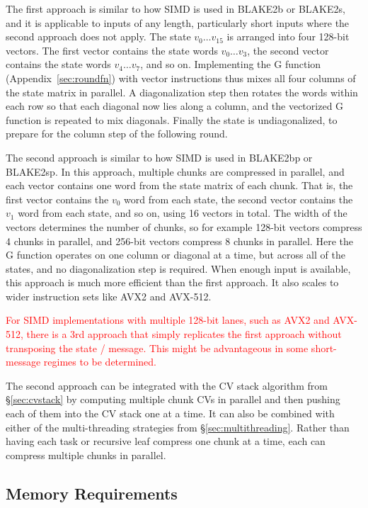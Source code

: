 \documentclass[11pt,notitlepage,a4paper]{article}
\newcommand{\alert}[1]{\textcolor{red}{#1}}
\begin{document}
The first approach is similar to how SIMD is used in BLAKE2b or BLAKE2s, and it
is applicable to inputs of any length, particularly short inputs where the
second approach does not apply. The state $v_0 \ldots v_{15}$ is arranged into
four 128-bit vectors. The first vector contains the state words $v_0 \ldots
v_3$, the second vector contains the state words $v_4 \ldots v_7$, and so on.
Implementing the G function (Appendix~\ref{sec:roundfn}) with vector
instructions thus mixes all four columns of the state matrix in parallel. A
diagonalization step then rotates the words within each row so that each
diagonal now lies along a column, and the vectorized G function is repeated to
mix diagonals. Finally the state is undiagonalized, to prepare for the column
step of the following round.

The second approach is similar to how SIMD is used in BLAKE2bp or BLAKE2sp. In
this approach, multiple chunks are compressed in parallel, and each vector
contains one word from the state matrix of each chunk. That is, the first
vector contains the $v_0$ word from each state, the second vector contains the
$v_1$ word from each state, and so on, using 16 vectors in total. The width of
the vectors determines the number of chunks, so for example 128-bit vectors
compress 4 chunks in parallel, and 256-bit vectors compress 8 chunks in
parallel. Here the G function operates on one column or diagonal at a time, but
across all of the states, and no diagonalization step is required. When enough
input is available, this approach is much more efficient than the first
approach. It also scales to wider instruction sets like AVX2 and AVX-512.

\alert{For SIMD implementations with multiple 128-bit lanes, such as AVX2 and AVX-512, there is a 3rd approach that simply replicates the first approach without transposing the state / message. This might be advantageous in some short-message regimes to be determined.}

The second approach can be integrated with the CV stack algorithm from
\S\ref{sec:cvstack} by computing multiple chunk CVs in parallel and then
pushing each of them into the CV stack one at a time. It can also be combined
with either of the multi-threading strategies from \S\ref{sec:multithreading}.
Rather than having each task or recursive leaf compress one chunk at a time,
each can compress multiple chunks in parallel.

\subsection{Memory Requirements}\label{sec:memory}
\end{document}
